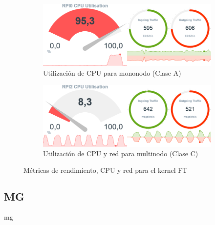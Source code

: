 \begin{figure}[h!]
    \begin{subfigure}[c]{0.9\textwidth}
        \includegraphics[width=\textwidth]{img/benchmark_rev/ft_rev_sn.png}
        \caption{Utilización de CPU para mononodo (Clase A)}
        \label{fig:mops_rev_sn__ft}
    \end{subfigure}

    \vspace{0.5cm}
    
    \begin{subfigure}[c]{0.9\textwidth}
        \includegraphics[width=\textwidth]{img/benchmark_rev/ft_rev_mn.png}
        \caption{Utilización de CPU y red para multinodo (Clase C)}
        \label{fig:mops_rev_mn__ft}
    \end{subfigure}
    \caption{Métricas de rendimiento, CPU y red para el kernel FT}
    \label{fig:mops__ft}
\end{figure}

\subsection{MG}
\label{ssec:comparacion_resultados__mg}
mg